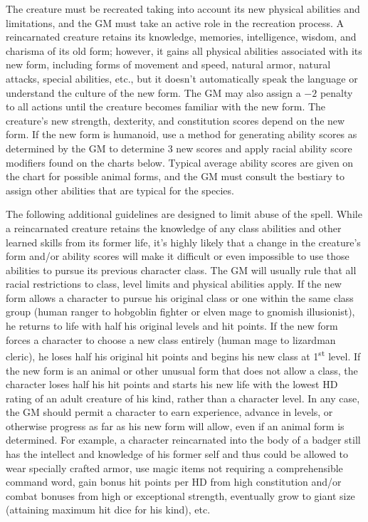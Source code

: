 \begin{multicols}{2}
The creature must be recreated taking into account its new physical abilities and limitations, and the GM must take an active role in the recreation process.  A reincarnated creature retains its knowledge, memories, intelligence, wisdom, and charisma of its old form; however, it gains all physical abilities associated with its new form, including forms of movement and speed, natural armor, natural attacks, special abilities, etc., but it doesn't automatically speak the language or understand the culture of the new form.  The GM may also assign a $-2$ penalty to all actions until the creature becomes familiar with the new form.  The creature's new strength, dexterity, and constitution scores depend on the new form.  If the new form is humanoid, use a method for generating ability scores as determined by the GM to determine 3 new scores and apply racial ability score modifiers found on the charts below.  Typical average ability scores are given on the chart for possible animal forms, and the GM must consult the bestiary to assign other abilities that are typical for the species.  

The following additional guidelines are designed to limit abuse of the spell.  While a reincarnated creature retains the knowledge of any class abilities and other learned skills from its former life, it's highly likely that a change in the creature's form and/or ability scores will make it difficult or even impossible to use those abilities to pursue its previous character class.  The GM will usually rule that all racial restrictions to class, level limits and physical abilities apply.  If the new form allows a character to pursue his original class or one within the same class group (human ranger to hobgoblin fighter or elven mage to gnomish illusionist), he returns to life with half his original levels and hit points.  If the new form forces a character to choose a new class entirely (human mage to lizardman cleric), he loses half his original hit points and begins his new class at 1\textsuperscript{st} level.  If the new form is an animal or other unusual form that does not allow a class, the character loses half his hit points and starts his new life with the lowest HD rating of an adult creature of his kind, rather than a character level.  In any case, the GM should permit a character to earn experience, advance in levels, or otherwise progress as far as his new form will allow, even if an animal form is determined.  For example, a character reincarnated into the body of a badger still has the intellect and knowledge of his former self and thus could be allowed to wear specially crafted armor, use magic items not requiring a comprehensible command word, gain bonus hit points per HD from high constitution and/or combat bonuses from high or exceptional strength, eventually grow to giant size (attaining maximum hit dice for his kind), etc.  


\end{multicols}
